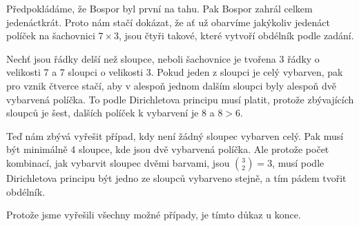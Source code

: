 \documentclass{fkssolpub}
\author{Ondřej Sedláček}
\begin{document}
Předpokládáme, že Bospor byl první na tahu. Pak Bospor zahrál celkem
jedenáctkrát. Proto nám stačí dokázat, že ať už obarvíme jakýkoliv
jedenáct políček na šachovnici $7 \times 3$, jsou čtyři takové, které
vytvoří obdélník podle zadání.

Nechť jsou řádky delší než sloupce, neboli šachovnice je tvořena 3 řádky o
velikosti 7 a 7 sloupci o velikosti 3. Pokud jeden z sloupci je celý vybarven, pak
pro vznik čtverce stačí, aby v alespoň jednom dalším sloupci byly alespoň
dvě vybarvená políčka. To podle Dirichletova principu musí platit, protože
zbývajících sloupců je šest, dalších políček k vybarvení je 8 a $8 > 6$.

Teď nám zbývá vyřešit případ, kdy není žádný sloupec vybarven celý. Pak musí
být minimálně 4 sloupce, kde jsou dvě vybarvená políčka. Ale protože
počet kombinací, jak vybarvit sloupec dvěmi barvami, jsou $\binom{3}{2} = 3$,
musí podle Dirichletova principu být jedno ze sloupců vybarveno stejně,
a tím pádem tvořit obdélník.

Protože jsme vyřešili všechny možné případy, je tímto důkaz u konce.
\end{document}
